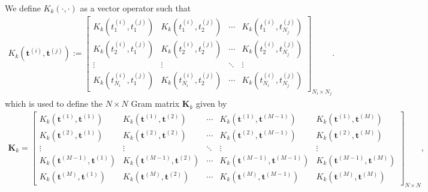 \documentclass[article,moreauthors,pdftex,10pt,a4paper]{ssrn}
\begin{document}
We define $K_k( \cdot, \cdot)$ as a vector operator such that 
\begin{align*}
K_k (\mathbf{t}^{(i)},\mathbf{t}^{(j)}  ) := \begin{bmatrix}
K_k(t_1^{(i)},t_1^{(j)}) & K_k(t_1^{(i)},t_2^{(j)})& \cdots & K_k(t_1^{(i)},t_{N_j}^{(j)}) \\
K_k(t_2^{(i)},t_1^{(j)}) & K_k(t_2^{(i)},t_2^{(j)})& \cdots & K_k(t_2^{(i)},t_{N_j}^{(j)}) \\
\vdots & \vdots & \ddots & \vdots  \\
K_k(t_{N_i}^{(i)},t_1^{(j)}) & K_k(t_{N_i}^{(i)},t_2^{(j)})& \cdots & K_k(t_{N_i}^{(i)},t_{N_j}^{(j)}) 
\end{bmatrix}_{ N_i \times	N_j}. 
\end{align*}
which is used to  define the $N \times N$ Gram matrix $\mathbf{K}_k$ given by
\begin{align*}
\mathbf{K}_{k} = \begin{bmatrix}
K_k (\mathbf{t}^{(1)},\mathbf{t}^{(1)}  )& K_k (\mathbf{t}^{(1)},\mathbf{t}^{(2)}  ) & \cdots & K_k (\mathbf{t}^{(1)},\mathbf{t}^{(M-1)}  ) & K_k (\mathbf{t}^{(1)},\mathbf{t}^{(M)}  ) \\
K_k (\mathbf{t}^{(2)},\mathbf{t}^{(1)}  )& K_k (\mathbf{t}^{(2)},\mathbf{t}^{(2)}  ) & \cdots & K_k (\mathbf{t}^{(2)},\mathbf{t}^{(M-1)}  ) & K_k (\mathbf{t}^{(2)},\mathbf{t}^{(M)}  ) \\
\vdots & \vdots & \ddots & \vdots & \vdots  \\
K_k (\mathbf{t}^{(M-1)},\mathbf{t}^{(1)}  )& K_k (\mathbf{t}^{(M-1)},\mathbf{t}^{(2)}  ) & \cdots & K_k (\mathbf{t}^{(M-1)},\mathbf{t}^{(M-1)}  ) & K_k (\mathbf{t}^{(M-1)},\mathbf{t}^{(M)}  ) \\
K_k (\mathbf{t}^{(M)},\mathbf{t}^{(1)}  )& K_k (\mathbf{t}^{(M)},\mathbf{t}^{(2)}  ) & \cdots & K_k (\mathbf{t}^{(M)},\mathbf{t}^{(M-1)}  ) & K_k (\mathbf{t}^{(M)},\mathbf{t}^{(M)}  ) 
\end{bmatrix}_{N \times N}, 
\end{align*}
\end{document}
